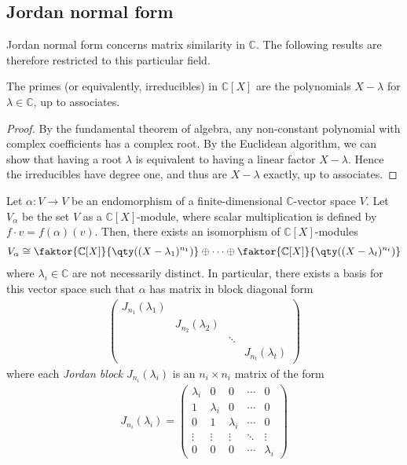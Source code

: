 \subsection{Jordan normal form}
Jordan normal form concerns matrix similarity in $\mathbb C$.
The following results are therefore restricted to this particular field.
\begin{lemma}
	The primes (or equivalently, irreducibles) in $\mathbb C[X]$ are the polynomials $X - \lambda$ for $\lambda \in \mathbb C$, up to associates.
\end{lemma}
\begin{proof}
	By the fundamental theorem of algebra, any non-constant polynomial with complex coefficients has a complex root.
	By the Euclidean algorithm, we can show that having a root $\lambda$ is equivalent to having a linear factor $X - \lambda$.
	Hence the irreducibles have degree one, and thus are $X - \lambda$ exactly, up to associates.
\end{proof}
\begin{theorem}
	Let $\alpha \colon V \to V$ be an endomorphism of a finite-dimensional $\mathbb C$-vector space $V$.
	Let $V_\alpha$ be the set $V$ as a $\mathbb C[X]$-module, where scalar multiplication is defined by $f\cdot v = f(\alpha)(v)$.
	Then, there exists an isomorphism of $\mathbb C[X]$-modules
	\begin{align*}
		V_\alpha \cong \faktor{\mathbb C[X]}{\qty((X-\lambda_1)^{n_1})} \oplus \dots \oplus \faktor{\mathbb C[X]}{\qty((X-\lambda_t)^{n_t})}
	\end{align*}
	where $\lambda_i \in \mathbb C$ are not necessarily distinct.
	In particular, there exists a basis for this vector space such that $\alpha$ has matrix in block diagonal form
	\begin{align*}
		\begin{pmatrix}
			J_{n_1}(\lambda_1)                                  \\
			 & J_{n_2}(\lambda_2)                               \\
			 &                    & \ddots                      \\
			 &                    &        & J_{n_t}(\lambda_t)
		\end{pmatrix}
	\end{align*}
	where each \textit{Jordan block} $J_{n_i}(\lambda_i)$ is an $n_i \times n_i$ matrix of the form
	\begin{align*}
		J_{n_i}(\lambda_i) = \begin{pmatrix}
			\lambda_i & 0         & 0         & \cdots & 0         \\
			1         & \lambda_i & 0         & \cdots & 0         \\
			0         & 1         & \lambda_i & \cdots & 0         \\
			\vdots    & \vdots    & \vdots    & \ddots & \vdots    \\
			0         & 0         & 0         & \cdots & \lambda_i
		\end{pmatrix}
	\end{align*}
\end{theorem}
